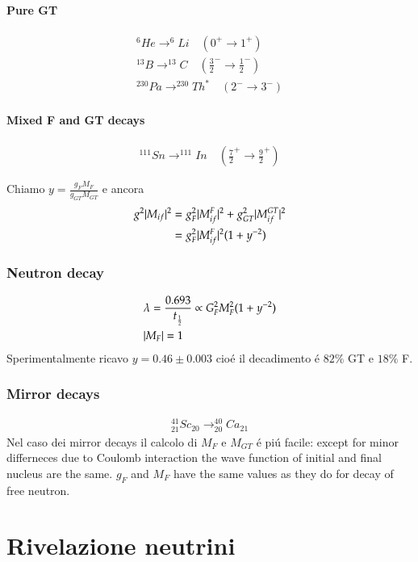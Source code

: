 \documentclass[main.tex]{subfiles}
\begin{document}
\subsection{Pure GT}
\begin{align*}
^6He\to^6Li\quad(0^+\to1^+)\\
^{13}B\to^{13}C\quad(\frac{3}{2}^-\to\frac{1}{2}^-)\\
^{230}Pa\to^{230}Th^*\quad(2^-\to3^-)
\end{align*}

\subsection{Mixed F and GT decays}
\begin{align*}
^{111}Sn\to^{111}In\quad(\frac{7}{2}^+\to\frac{9}{2}^+)
\end{align*}

Chiamo $y=\frac{g_FM_F}{g_{GT}M_{GT}}$ e ancora
\begin{align*}
g^2|M_{if}|^2&=g_F^2|M_{if}^F|^2+g_{GT}^2|M_{if}^{GT}|^2\\
&=g_F^2|M_{if}^F|^2(1+y^{-2})
\end{align*}

\section{Neutron decay}

\begin{align*}
&\lambda=\frac{0.693}{t_{\frac{1}{2}}}\propto G_F^2M_F^2(1+y^{-2})\\
&|M_F|=1
\end{align*}
Sperimentalmente ricavo $y=0.46\pm0.003$ cio\'e il decadimento \'e $82\%$ GT e $18\%$ F.

\section{Mirror decays}
\begin{align*}
^{41}_{21}Sc_{20}\to^{40}_{20}Ca_{21}
\end{align*}
Nel caso dei mirror decays il calcolo di $M_F$ e $M_{GT}$ \'e pi\'u facile: except for minor differneces due to Coulomb interaction the wave function of initial and final nucleus are the same.
$g_F$ and $M_F$ have the same values as they do for decay of free neutron.


\part{Rivelazione neutrini}
\end{document}
